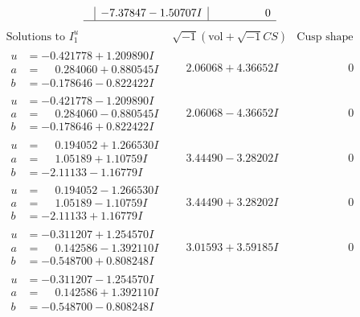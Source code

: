 \documentclass[1p]{elsarticle_modified}
\theoremstyle{definition}
\newcommand{\I}{\sqrt{-1}}
\begin{document}
$$\begin{array}{c|c|c}
 & -7.37847 - 1.50707 I & \phantom{-0.000000 } 0\\
 \hline 
 \end{array}$$\newpage$$\begin{array}{c|c|c}  
\text{Solutions to }I^u_{1}& \I (\text{vol} + \sqrt{-1}CS) & \text{Cusp shape}\\
 \hline 
\begin{aligned}
u &= -0.421778 + 1.209890 I \\
a &= \phantom{-}0.284060 + 0.880545 I \\
b &= -0.178646 - 0.822422 I\end{aligned}
 & \phantom{-}2.06068 + 4.36652 I & \phantom{-0.000000 } 0 \\ \hline\begin{aligned}
u &= -0.421778 - 1.209890 I \\
a &= \phantom{-}0.284060 - 0.880545 I \\
b &= -0.178646 + 0.822422 I\end{aligned}
 & \phantom{-}2.06068 - 4.36652 I & \phantom{-0.000000 } 0 \\ \hline\begin{aligned}
u &= \phantom{-}0.194052 + 1.266530 I \\
a &= \phantom{-}1.05189 + 1.10759 I \\
b &= -2.11133 - 1.16779 I\end{aligned}
 & \phantom{-}3.44490 - 3.28202 I & \phantom{-0.000000 } 0 \\ \hline\begin{aligned}
u &= \phantom{-}0.194052 - 1.266530 I \\
a &= \phantom{-}1.05189 - 1.10759 I \\
b &= -2.11133 + 1.16779 I\end{aligned}
 & \phantom{-}3.44490 + 3.28202 I & \phantom{-0.000000 } 0 \\ \hline\begin{aligned}
u &= -0.311207 + 1.254570 I \\
a &= \phantom{-}0.142586 - 1.392110 I \\
b &= -0.548700 + 0.808248 I\end{aligned}
 & \phantom{-}3.01593 + 3.59185 I & \phantom{-0.000000 } 0 \\ \hline\begin{aligned}
u &= -0.311207 - 1.254570 I \\
a &= \phantom{-}0.142586 + 1.392110 I \\
b &= -0.548700 - 0.808248 I\end{aligned}

\end{array}$$
\end{document}
